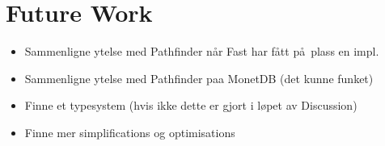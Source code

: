 \chapter{Future Work}
\label{chapter:future}
\begin{itemize}	
  \item Sammenligne ytelse med Pathfinder n\aa r Fast har f\aa tt p\aa~plass en impl.
  \item Sammenligne ytelse med Pathfinder paa MonetDB (det kunne funket) 
  \item Finne et typesystem (hvis ikke dette er gjort i l\o pet av Discussion)
  \item Finne mer simplifications og optimisations
\end{itemize}